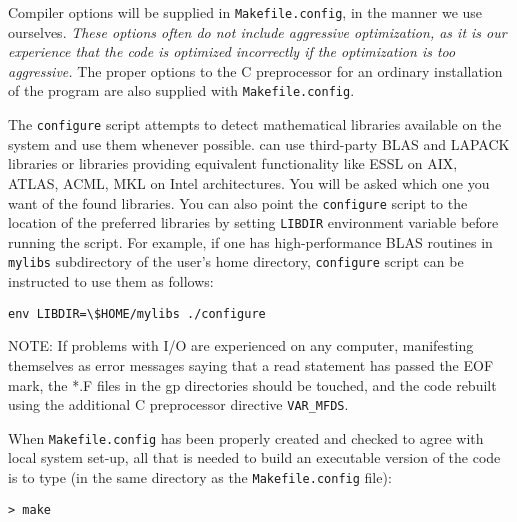 Compiler options will be supplied in \verb|Makefile.config|, in the manner
we use ourselves. {\em These options often do not include aggressive
optimization, as
it is our experience that
the code is optimized incorrectly if the optimization is too
aggressive.} The proper options to the C preprocessor for an ordinary
installation of the program are also supplied with
\verb|Makefile.config|.

The \verb|configure| script attempts to detect mathematical libraries
available on the system and use them whenever possible. {\dalton} can
use third-party BLAS and LAPACK libraries or libraries providing
equivalent functionality like ESSL on AIX, ATLAS, ACML, MKL on Intel
architectures.
You will be asked which one you want of the found libraries.
You can also point the \verb|configure|
script to the location of the preferred libraries by setting
\verb|LIBDIR| environment variable before running the script. For
example, if one has high-performance BLAS routines in \verb|mylibs|
subdirectory of the user's home directory, \verb|configure| script can
be instructed to use them as follows:
\begin{verbatim}
env LIBDIR=\$HOME/mylibs ./configure
\end{verbatim}


NOTE: If problems with I/O are experienced on
any computer,
manifesting themselves as error messages saying that a read statement
has passed the EOF mark, the *.F files in the gp directories should be
touched, and the code rebuilt using the additional C preprocessor
directive \verb|VAR_MFDS|.

When  \verb|Makefile.config| has been properly
created and checked
to agree with local system set-up, all that is needed
to build an executable version of the
code is to type
(in the same directory as the \verb|Makefile.config| file):
\begin{verbatim}
> make
\end{verbatim}

